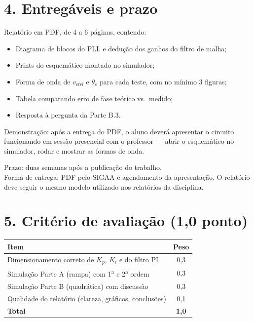 \documentclass[11pt,a4paper]{article}
\begin{document}
\section*{4. Entregáveis e prazo}

\begin{entrega}
Relatório em PDF, de 4 a 6 páginas, contendo:
\begin{itemize}[leftmargin=1.5em]
  \item Diagrama de blocos do PLL e dedução dos ganhos do filtro de malha;
  \item Prints do esquemático montado no simulador;
  \item Forma de onda de $v_{ctrl}$ e $\theta_e$ para cada teste, com no mínimo 3 figuras;
  \item Tabela comparando erro de fase teórico vs.\ medido;
  \item Resposta à pergunta da Parte B.3.
\end{itemize}
Demonstração: após a entrega do PDF, o aluno deverá apresentar o circuito
funcionando em sessão presencial com o professor --- abrir o esquemático no simulador, rodar e mostrar
as formas de onda.
\end{entrega}

Prazo: duas semanas após a publicação do trabalho.\\
Forma de entrega: PDF pelo SIGAA e agendamento da apresentação. O relatório deve seguir o mesmo
modelo utilizado nos relatórios da disciplina.

\section*{5. Critério de avaliação (1{,}0 ponto)}

\begin{center}
\begin{tabular}{lc}
\toprule
\textbf{Item} & \textbf{Peso} \\
\midrule
Dimensionamento correto de $K_p,\,K_i$ e do filtro PI       & 0{,}3 \\
Simulação Parte A (rampa) com 1\textsuperscript{a} e 2\textsuperscript{a} ordem & 0{,}3 \\
Simulação Parte B (quadrática) com discussão                & 0{,}3 \\
Qualidade do relatório (clareza, gráficos, conclusões)      & 0{,}1 \\
\midrule
\textbf{Total}                                              & \textbf{1{,}0} \\
\bottomrule
\end{tabular}
\end{center}
\end{document}
